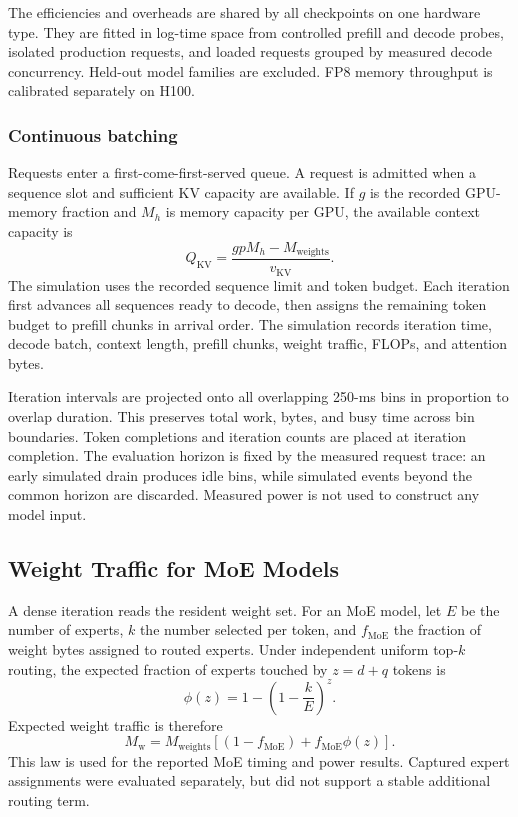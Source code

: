 The efficiencies and overheads are shared by all checkpoints on one hardware
type.  They are fitted in log-time space from controlled prefill and decode
probes, isolated production requests, and loaded requests grouped by measured
decode concurrency.  Held-out model families are excluded.  FP8 memory
throughput is calibrated separately on H100.

\subsubsection{Continuous batching}

Requests enter a first-come-first-served queue.  A request is admitted when a
sequence slot and sufficient KV capacity are available.  If $g$ is the
recorded GPU-memory fraction and $M_h$ is memory capacity per GPU, the available
context capacity is
\begin{equation}
  Q_{\mathrm{KV}}=
  \frac{g pM_h-M_{\mathrm{weights}}}{v_{\mathrm{KV}}}.
  \label{eq:kv-capacity}
\end{equation}
The simulation uses the recorded sequence limit and token budget.  Each
iteration first advances all sequences ready to decode, then assigns the
remaining token budget to prefill chunks in arrival order.  The simulation
records iteration time, decode batch, context length, prefill chunks, weight
traffic, FLOPs, and attention bytes.

Iteration intervals are projected onto all overlapping 250-ms bins in
proportion to overlap duration.  This preserves total work, bytes, and busy
time across bin boundaries.  Token completions and iteration counts are placed
at iteration completion.  The evaluation horizon is fixed by the measured
request trace: an early simulated drain produces idle bins, while simulated
events beyond the common horizon are discarded.  Measured power is not used
to construct any model input.

\subsection{Weight Traffic for MoE Models}
\label{sec:routing-method}

A dense iteration reads the resident weight set.  For an MoE model, let $E$ be
the number of experts, $k$ the number selected per token, and $f_{\mathrm{MoE}}$
the fraction of weight bytes assigned to routed experts.  Under independent
uniform top-$k$ routing, the expected fraction of experts touched by
$z=d+q$ tokens is
\begin{equation}
  \phi(z)=1-\left(1-\frac{k}{E}\right)^z.
  \label{eq:uniform-routing}
\end{equation}
Expected weight traffic is therefore
\begin{equation}
  M_{\mathrm{w}}=M_{\mathrm{weights}}
  \left[(1-f_{\mathrm{MoE}})+f_{\mathrm{MoE}}\phi(z)\right].
  \label{eq:moe-weight-bytes}
\end{equation}
This law is used for the reported MoE timing and power results.  Captured
expert assignments were evaluated separately, but did not support a stable
additional routing term.

